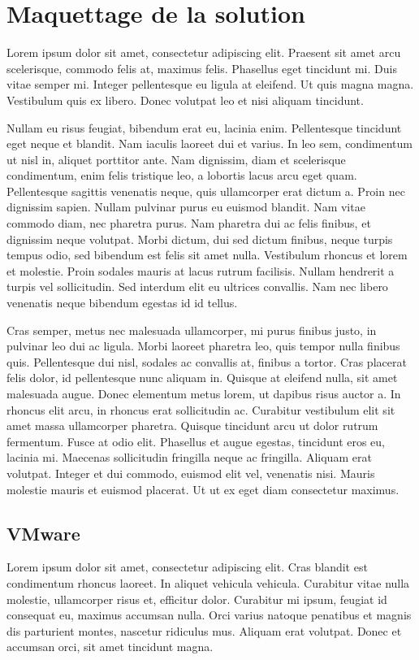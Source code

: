 \documentclass{report}
\begin{document}
\section{Maquettage de la solution}
Lorem ipsum dolor sit amet, consectetur adipiscing elit. Praesent sit amet arcu scelerisque, commodo felis at, maximus felis. Phasellus eget tincidunt mi. Duis vitae semper mi. Integer pellentesque eu ligula at eleifend. Ut quis magna magna. Vestibulum quis ex libero. Donec volutpat leo et nisi aliquam tincidunt.

Nullam eu risus feugiat, bibendum erat eu, lacinia enim. Pellentesque tincidunt eget neque et blandit. Nam iaculis laoreet dui et varius. In leo sem, condimentum ut nisl in, aliquet porttitor ante. Nam dignissim, diam et scelerisque condimentum, enim felis tristique leo, a lobortis lacus arcu eget quam. Pellentesque sagittis venenatis neque, quis ullamcorper erat dictum a. Proin nec dignissim sapien. Nullam pulvinar purus eu euismod blandit. Nam vitae commodo diam, nec pharetra purus. Nam pharetra dui ac felis finibus, et dignissim neque volutpat. Morbi dictum, dui sed dictum finibus, neque turpis tempus odio, sed bibendum est felis sit amet nulla. Vestibulum rhoncus et lorem et molestie. Proin sodales mauris at lacus rutrum facilisis. Nullam hendrerit a turpis vel sollicitudin. Sed interdum elit eu ultrices convallis. Nam nec libero venenatis neque bibendum egestas id id tellus.

Cras semper, metus nec malesuada ullamcorper, mi purus finibus justo, in pulvinar leo dui ac ligula. Morbi laoreet pharetra leo, quis tempor nulla finibus quis. Pellentesque dui nisl, sodales ac convallis at, finibus a tortor. Cras placerat felis dolor, id pellentesque nunc aliquam in. Quisque at eleifend nulla, sit amet malesuada augue. Donec elementum metus lorem, ut dapibus risus auctor a. In rhoncus elit arcu, in rhoncus erat sollicitudin ac. Curabitur vestibulum elit sit amet massa ullamcorper pharetra. Quisque tincidunt arcu ut dolor rutrum fermentum. Fusce at odio elit. Phasellus et augue egestas, tincidunt eros eu, lacinia mi. Maecenas sollicitudin fringilla neque ac fringilla. Aliquam erat volutpat. Integer et dui commodo, euismod elit vel, venenatis nisi. Mauris molestie mauris et euismod placerat. Ut ut ex eget diam consectetur maximus.

\subsection{VMware}
Lorem ipsum dolor sit amet, consectetur adipiscing elit. Cras blandit est condimentum rhoncus laoreet. In aliquet vehicula vehicula. Curabitur vitae nulla molestie, ullamcorper risus et, efficitur dolor. Curabitur mi ipsum, feugiat id consequat eu, maximus accumsan nulla. Orci varius natoque penatibus et magnis dis parturient montes, nascetur ridiculus mus. Aliquam erat volutpat. Donec et accumsan orci, sit amet tincidunt magna.
\end{document}
